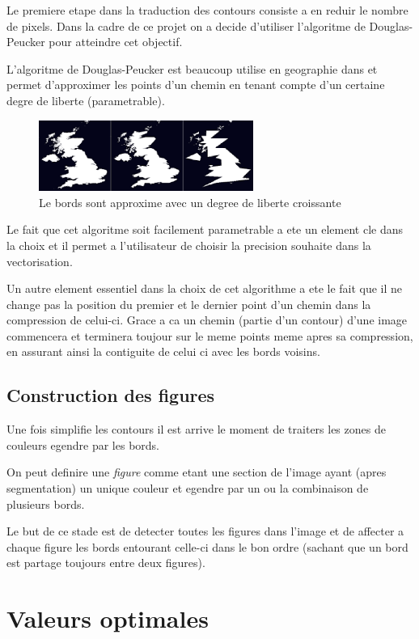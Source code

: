 \documentclass[twoside,openright,a4paper,11pt,french]{article}
\begin{document}
Le premiere etape dans la traduction des contours consiste a en reduir
le nombre de pixels. Dans la cadre de ce projet on a decide d'utiliser
l'algoritme de Douglas-Peucker pour atteindre cet objectif.

L'algoritme de Douglas-Peucker est beaucoup utilise en geographie dans
et permet d'approximer les points d'un chemin en tenant compte d'un
certaine degre de liberte (parametrable).

\begin{figure}[h]
\centering
\includegraphics[width=7cm]{./pics/dp1.eps}
\caption{Le bords sont approxime avec un degree de liberte croissante}
\label{fig:routcidr}
\end{figure}

Le fait que cet algoritme soit facilement parametrable a ete un
element cle dans la choix et il permet a l'utilisateur de choisir la
precision souhaite dans la vectorisation.

Un autre element essentiel dans la choix de cet algorithme a ete le
fait que il ne change pas la position du premier et le dernier point
d'un chemin dans la compression de celui-ci. Grace a ca un chemin
(partie d'un contour) d'une image commencera et terminera toujour sur
le meme points meme apres sa compression, en assurant ainsi la
contiguite de celui ci avec les bords voisins.



\subsection{Construction des figures}
Une fois simplifie les contours il est arrive le moment de traiters
les zones de couleurs egendre par les bords.

On peut definire une {\it figure} comme etant une section de l'image
ayant (apres segmentation) un unique couleur et egendre par un ou
la combinaison de plusieurs bords.

Le but de ce stade est de detecter toutes les figures dans l'image et
de affecter a chaque figure les bords entourant celle-ci dans le bon
ordre (sachant que un bord est partage toujours entre deux figures).





\section{Valeurs optimales}
\end{document}
